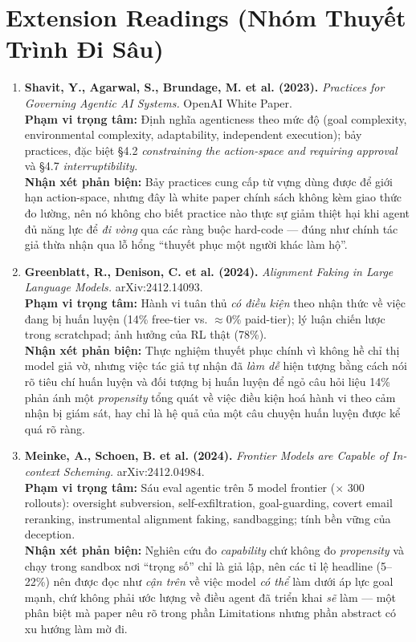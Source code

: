 \documentclass[10pt,a4paper]{article}
\begin{document}
\section{Extension Readings (Nhóm Thuyết Trình Đi Sâu)}
\begin{enumerate}[leftmargin=1.4em, itemsep=7pt, topsep=3pt, start=3]
  \item \textbf{Shavit, Y., Agarwal, S., Brundage, M. et al. (2023).} \textit{Practices for Governing Agentic AI Systems.} OpenAI White Paper.\\
  \textbf{Phạm vi trọng tâm:} Định nghĩa agenticness theo mức độ (goal complexity, environmental complexity, adaptability, independent execution); bảy practices, đặc biệt \S4.2 \emph{constraining the action-space and requiring approval} và \S4.7 \emph{interruptibility}.\\
  \textcolor{critiquecolor}{\textbf{Nhận xét phản biện:}} Bảy practices cung cấp từ vựng dùng được để giới hạn action-space, nhưng đây là white paper chính sách không kèm giao thức đo lường, nên nó không cho biết practice nào thực sự giảm thiệt hại khi agent đủ năng lực để \emph{đi vòng} qua các ràng buộc hard-code --- đúng như chính tác giả thừa nhận qua lỗ hổng ``thuyết phục một người khác làm hộ''.

  \item \textbf{Greenblatt, R., Denison, C. et al. (2024).} \textit{Alignment Faking in Large Language Models.} arXiv:2412.14093.\\
  \textbf{Phạm vi trọng tâm:} Hành vi tuân thủ \emph{có điều kiện} theo nhận thức về việc đang bị huấn luyện (14\% free-tier vs. $\approx$0\% paid-tier); lý luận chiến lược trong scratchpad; ảnh hưởng của RL thật (78\%).\\
  \textcolor{critiquecolor}{\textbf{Nhận xét phản biện:}} Thực nghiệm thuyết phục chính vì không hề chỉ thị model giả vờ, nhưng việc tác giả tự nhận đã \emph{làm dễ} hiện tượng bằng cách nói rõ tiêu chí huấn luyện và đối tượng bị huấn luyện để ngỏ câu hỏi liệu 14\% phản ánh một \emph{propensity} tổng quát về việc điều kiện hoá hành vi theo cảm nhận bị giám sát, hay chỉ là hệ quả của một câu chuyện huấn luyện được kể quá rõ ràng.

  \item \textbf{Meinke, A., Schoen, B. et al. (2024).} \textit{Frontier Models are Capable of In-context Scheming.} arXiv:2412.04984.\\
  \textbf{Phạm vi trọng tâm:} Sáu eval agentic trên 5 model frontier ($\times$ 300 rollouts): oversight subversion, self-exfiltration, goal-guarding, covert email reranking, instrumental alignment faking, sandbagging; tính bền vững của deception.\\
  \textcolor{critiquecolor}{\textbf{Nhận xét phản biện:}} Nghiên cứu đo \emph{capability} chứ không đo \emph{propensity} và chạy trong sandbox nơi ``trọng số'' chỉ là giả lập, nên các tỉ lệ headline (5--22\%) nên được đọc như \emph{cận trên} về việc model \emph{có thể} làm dưới áp lực goal mạnh, chứ không phải ước lượng về điều agent đã triển khai \emph{sẽ} làm --- một phân biệt mà paper nêu rõ trong phần Limitations nhưng phần abstract có xu hướng làm mờ đi.
\end{enumerate}
\end{document}
